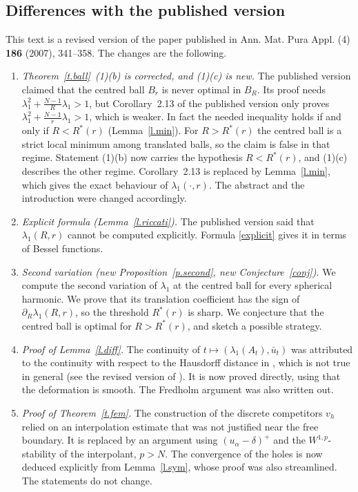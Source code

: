 \documentclass[11pt]{amsart}
\theoremstyle{remark}
\numberwithin{equation}{section}
\begin{document}
\subsection*{Differences with the published version}
This text is a revised version of the paper published in Ann. Mat. Pura Appl. (4) \textbf{186} (2007), 341--358. The changes are the following.
\begin{enumerate}
\item \emph{Theorem~\ref{t.ball}~(1)(b) is corrected, and (1)(c) is new.} The published version claimed that the centred ball $B_r$ is never optimal in $B_R$. Its proof needs $\lambda_1^2+\frac{N-1}R\lambda_1>1$, but Corollary~2.13 of the published version only proves $\lambda_1^2+\frac{N-1}r\lambda_1>1$, which is weaker. In fact the needed inequality holds if and only if $R<R^*(r)$ (Lemma~\ref{l.min}). For $R>R^*(r)$ the centred ball is a strict local minimum among translated balls, so the claim is false in that regime. Statement (1)(b) now carries the hypothesis $R<R^*(r)$, and (1)(c) describes the other regime. Corollary~2.13 is replaced by Lemma~\ref{l.min}, which gives the exact behaviour of $\lambda_1(\cdot,r)$. The abstract and the introduction were changed accordingly.
\item \emph{Explicit formula (Lemma~\ref{l.riccati}).} The published version said that $\lambda_1(R,r)$ cannot be computed explicitly. Formula \eqref{explicit} gives it in terms of Bessel functions.
\item \emph{Second variation (new Proposition~\ref{p.second}, new Conjecture~\ref{conj}).} We compute the second variation of $\lambda_1$ at the centred ball for every spherical harmonic. We prove that its translation coefficient has the sign of $\partial_R\lambda_1(R,r)$, so the threshold $R^*(r)$ is sharp. We conjecture that the centred ball is optimal for $R>R^*(r)$, and sketch a possible strategy.
\item \emph{Proof of Lemma~\ref{l.diff}.} The continuity of $t\mapsto(\lambda_1(A_t),\bar u_t)$ was attributed to the continuity with respect to the Hausdorff distance in \cite{FBRW1}, which is not true in general (see the revised version of \cite{FBRW1}). It is now proved directly, using that the deformation is smooth. The Fredholm argument was also written out.
\item \emph{Proof of Theorem~\ref{t.fem}.} The construction of the discrete competitors $v_h$ relied on an interpolation estimate that was not justified near the free boundary. It is replaced by an argument using $(u_\alpha-\delta)^+$ and the $W^{1,p}$-stability of the interpolant, $p>N$. The convergence of the holes is now deduced explicitly from Lemma~\ref{l.sym}, whose proof was also streamlined. The statements do not change.

\end{enumerate}
\end{document}
